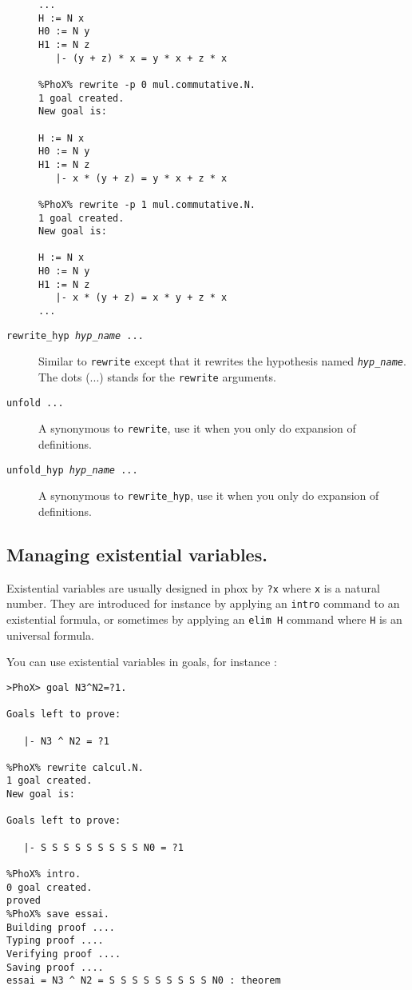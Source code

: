 \begin{description}
\begin{verbatim}
...
H := N x
H0 := N y
H1 := N z
   |- (y + z) * x = y * x + z * x

%PhoX% rewrite -p 0 mul.commutative.N.
1 goal created.
New goal is:

H := N x
H0 := N y
H1 := N z
   |- x * (y + z) = y * x + z * x

%PhoX% rewrite -p 1 mul.commutative.N.
1 goal created.
New goal is:

H := N x
H0 := N y
H1 := N z
   |- x * (y + z) = x * y + z * x
...
\end{verbatim}


\item[\tt rewrite\_hyp {\em hyp\_name}  ...\idx{rewrite\_hyp}]

  Similar to {\tt rewrite} except that it rewrites the hypothesis named  
  {\tt\em hyp\_name}. The dots (...) stands for the {\tt rewrite} arguments.

\item[\tt unfold ...\idx{unfold}]

  A synonymous to {\tt rewrite}, use it when you only do expansion
  of definitions.

\item[\tt unfold\_hyp {\em hyp\_name}  ...\idx{unfold\_hyp}]

  A synonymous to {\tt rewrite\_hyp}, use it when you only do expansion
  of definitions.

\end{description}

\subsection{Managing existential variables.}

Existential variables are usually designed in phox by {\tt ?x} where
{\tt x} is a natural number. They are introduced for instance by
applying an {\tt intro} command to an existential formula, or sometimes
by applying an {\tt elim H} command where {\tt H} is  an universal formula.

You can use existential variables in goals, for instance :

\begin{verbatim}
>PhoX> goal N3^N2=?1.  

Goals left to prove:

   |- N3 ^ N2 = ?1

%PhoX% rewrite calcul.N.  
1 goal created.
New goal is:

Goals left to prove:

   |- S S S S S S S S S N0 = ?1

%PhoX% intro.  
0 goal created.
proved
%PhoX% save essai.  
Building proof .... 
Typing proof .... 
Verifying proof .... 
Saving proof ....
essai = N3 ^ N2 = S S S S S S S S S N0 : theorem
\end{verbatim}

